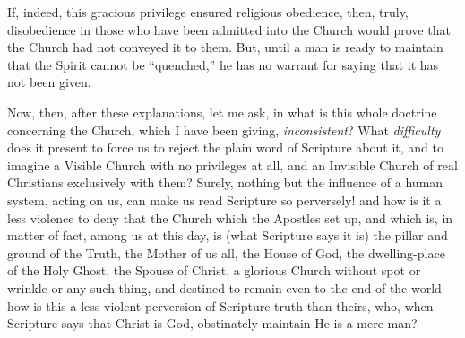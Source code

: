 If, indeed, this gracious privilege ensured religious obedience,
then, truly, disobedience in those who have been admitted into the
Church would prove that the Church had not conveyed it to them. But,
until a man is ready to maintain that the Spirit cannot be
``quenched,'' he has no warrant for saying that it has not
been given.

Now, then, after these explanations, let me ask, in what is this
whole doctrine concerning the Church, which I have been giving, \emph{inconsistent}?
What \emph{difficulty} does it present to force us to reject the plain
word of Scripture about it, and to imagine a Visible Church with no
privileges at all, and an Invisible Church of real Christians
exclusively with them? Surely, nothing but the influence of a human
system, acting on us, can make us read Scripture so perversely! and
how is it a less violence to deny that the Church which the Apostles
set up, and which is, in matter of fact, among us at this day, is
(what Scripture says it is) the pillar and ground of the Truth, the
Mother of us all, the House of God, the dwelling-place of the Holy
Ghost, the Spouse of Christ, a glorious Church without spot or wrinkle
or any such thing, and destined to remain even to the end of the world—how
is this a less violent perversion of Scripture truth than theirs, who,
when Scripture says that Christ is God, obstinately maintain He is a
mere man?

